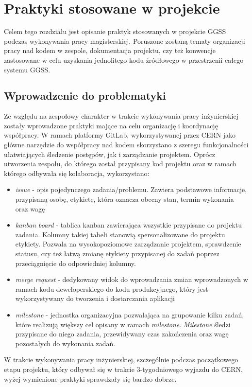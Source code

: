 \chapter{Praktyki stosowane w projekcie} %
\label{cha:practices}

Celem tego rozdziału jest opisanie praktyk stosowanych w projekcie GGSS podczas wykonywania pracy magisterskiej. Poruszone zostaną tematy organizacji pracy nad kodem w zespole, dokumentacja projektu, czy też konwencje zastosowane w celu uzyskania jednolitego kodu źródłowego w przestrzenii całego systemu GGSS.

\section{Wprowadzenie do problematyki}
Ze względu na zespołowy charakter w trakcie wykonywania pracy inżynierskiej zostały wprowadzone praktyki mające na celu organizację i koordynację współpracy. W ramach platformy GitLab, wykorzystywanej przez CERN jako główne narzędzie do współpracy nad kodem skorzystano z szeregu funkcjonalności ułatwiających śledzenie postępów, jak i zarządzanie projektem. Oprócz utworzenia zespołu, do którego został przypisany kod projektu oraz w ramach którego odbywała się kolaboracja, wykorzystano:
\begin{itemize}
\item \emph{issue} - opis pojedynczego zadania/problemu. Zawiera podstawowe informacje, przypisaną osobę, etykietę, która oznacza obecny stan, termin wykonania oraz wagę
\item \emph{kanban board} - tablica kanban zawierająca wszystkie przypisane do projektu zadania. Kolumny takiej tabeli stanowią spersonalizowane do projektu etykiety. Pozwala na wysokopoziomowe zarządzanie projektem, sprawdzenie statusu, czy też łatwą zmianę etykiety przypisanej do zadań poprzez przeciągnięcie do odpowiedniej kolumny. %
\item \emph{merge request} - dedykowany widok do wprowadzania zmian wprowadzonych w ramach kodu deweloperskiego do kodu produkcyjnego, który jest wykorzystywany do tworzenia i dostarczania aplikacji
\item \emph{milestone} - jednostka organizacyjna pozwalająca na grupowanie kilku zadań, które realizują większy cel opisany w ramach \emph{milestone}. \emph{Milestone} śledzi przypisane do niego zadania, przewidywany czas zakończenia oraz wagę pozostałych do wykonania zadań.
\end{itemize}
W trakcie wykonywania pracy inżynierskiej, szczególnie podczas początkowego etapu projektu, który odbywał się w trakcie 3-tygodniowego wyjazdu do CERN, wyżej wymienione praktyki sprawdzały się bardzo dobrze.

